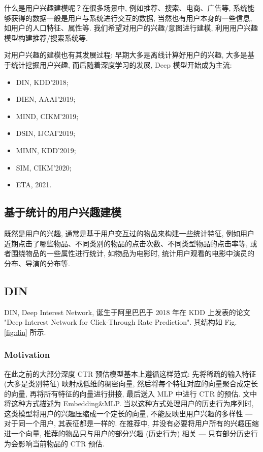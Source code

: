 什么是用户兴趣建模呢？在很多场景中, 例如推荐、搜索、电商、广告等, 系统能够获得的数据一般是用户与系统进行交互的数据, 当然也有用户本身的一些信息, 如用户的人口特征、属性等. 我们希望对用户的兴趣/意图进行建模, 利用用户兴趣模型构建推荐/搜索系统等. 

对用户兴趣的建模也有其发展过程: 早期大多是离线计算好用户的兴趣, 大多是基于统计挖掘用户兴趣, 而后随着深度学习的发展, Deep 模型开始成为主流: 
\begin{itemize}
	\item DIN, KDD'2018; 
	\item DIEN, AAAI'2019; 
	\item MIND, CIKM'2019;
	\item DSIN, IJCAI'2019;
	\item MIMN, KDD'2019;
	\item SIM, CIKM'2020;
	\item ETA, 2021.
\end{itemize}


\subsection{基于统计的用户兴趣建模}
既然是用户的兴趣, 通常是基于用户交互过的物品来构建一些统计特征, 例如用户近期点击了哪些物品、不同类别的物品的点击次数、不同类型物品的点击率等, 或者围绕物品的一些属性进行统计, 如物品为电影时, 统计用户观看的电影中演员的分布、导演的分布等. 

\subsection{DIN}
DIN, Deep Interest Network, 诞生于阿里巴巴于 2018 年在 KDD 上发表的论文 "Deep Interest Network for Click-Through Rate Prediction". 其结构如 Fig. \ref{fig:din} 所示.

\subsubsection{Motivation}
在此之前的大部分深度 CTR 预估模型基本上遵循这样范式: 先将稀疏的输入特征 (大多是类别特征) 映射成低维的稠密向量, 然后将每个特征对应的向量聚合成定长的向量, 再将所有特征的向量进行拼接, 最后送入 MLP 中进行 CTR 的预估. 文中将这种方式描述为 Embedding\&MLP. 当以这种方式处理用户的历史行为序列时, 这类模型将用户的兴趣压缩成一个定长的向量, 不能反映出用户兴趣的多样性 --- 对于同一个用户, 其表征都是一样的. 在推荐中, 并没有必要将用户所有的兴趣压缩进一个向量, 推荐的物品只与用户的部分兴趣 (历史行为) 相关 --- 只有部分历史行为会影响当前物品的 CTR 预估. 

